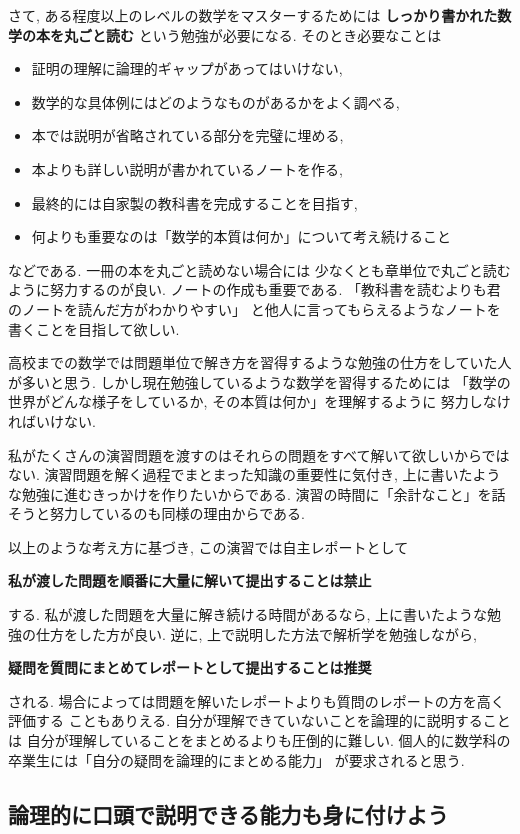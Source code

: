 \documentclass[12pt,twoside]{jarticle}
\begin{document}
さて, ある程度以上のレベルの数学をマスターするためには
{\bf しっかり書かれた数学の本を丸ごと読む}
という勉強が必要になる. そのとき必要なことは
\begin{itemize}
 \item 証明の理解に論理的ギャップがあってはいけない,
 \item 数学的な具体例にはどのようなものがあるかをよく調べる,
 \item 本では説明が省略されている部分を完璧に埋める,
 \item 本よりも詳しい説明が書かれているノートを作る,
 \item 最終的には自家製の教科書を完成することを目指す,
 \item 何よりも重要なのは「数学的本質は何か」について考え続けること
\end{itemize}
などである. 
一冊の本を丸ごと読めない場合には
少なくとも章単位で丸ごと読むように努力するのが良い.
ノートの作成も重要である.
「教科書を読むよりも君のノートを読んだ方がわかりやすい」
と他人に言ってもらえるようなノートを書くことを目指して欲しい.

高校までの数学では問題単位で解き方を習得するような勉強の仕方をしていた人
が多いと思う. しかし現在勉強しているような数学を習得するためには
「数学の世界がどんな様子をしているか, その本質は何か」を理解するように
努力しなければいけない. 

私がたくさんの演習問題を渡すのはそれらの問題をすべて解いて欲しいからでは
ない. 演習問題を解く過程でまとまった知識の重要性に気付き, 
上に書いたような勉強に進むきっかけを作りたいからである.
演習の時間に「余計なこと」を話そうと努力しているのも同様の理由からである.

以上のような考え方に基づき, 
この演習では自主レポートとして
\begin{center}
 \large\bf 私が渡した問題を順番に大量に解いて提出することは禁止
\end{center}
する. 私が渡した問題を大量に解き続ける時間があるなら, 
上に書いたような勉強の仕方をした方が良い.
逆に, 上で説明した方法で解析学を勉強しながら, 
\begin{center}
 \large\bf 疑問を質問にまとめてレポートとして提出することは推奨
\end{center}
される.
場合によっては問題を解いたレポートよりも質問のレポートの方を高く評価する
こともありえる.  自分が理解できていないことを論理的に説明することは
自分が理解していることをまとめるよりも圧倒的に難しい.
個人的に数学科の卒業生には「自分の疑問を論理的にまとめる能力」
が要求されると思う.

\subsection{論理的に口頭で説明できる能力も身に付けよう}
\end{document}
